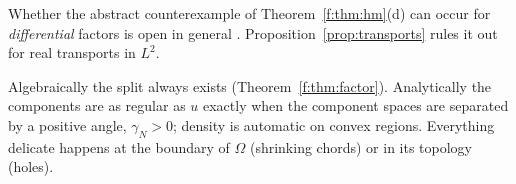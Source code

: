 \begin{caution}[title={Three or more components: what is still open}]
Whether the abstract counterexample of Theorem~\ref{f:thm:hm}(d) can occur for \emph{differential} factors is open in general \openq{} . Proposition~\ref{prop:transports} rules it out for real transports in $L^2$.
\end{caution}

\begin{keypoint}
Algebraically the split always exists (Theorem~\ref{f:thm:factor}). Analytically the components are as regular as $u$ exactly when the component spaces are separated by a positive angle, $\gamma_N>0$; density is automatic on convex regions. Everything delicate happens at the boundary of $\Omega$ (shrinking chords) or in its topology (holes).
\end{keypoint}

